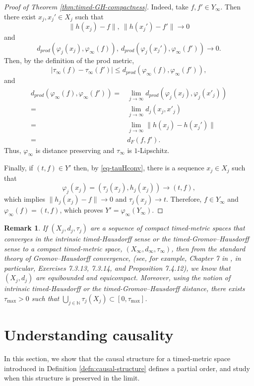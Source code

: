 \documentclass[a4paper,12pt,reqno]{amsart}
\theoremstyle{plain}
\newtheorem{rmrk}[thm]{Remark}
\newcommand{\be}{\begin{equation}}
\newcommand{\ee}{\end{equation}}
\begin{document}
\begin{proof}[Proof of Theorem \ref{thm:timed-GH-compactness}]
Indeed, take $f,f' \in Y_\infty$. 
Then there exist $x_j, x_j' \in X_j$ such that 
\be
 \| h(x_j)-f\| , \ \| h(x_j')- f'\| \to 0
\ee
and 
\be
d_{prod}(\varphi_j(x_j), \varphi_{\infty}(f)), \ 
d_{prod}(\varphi_j(x_j'), \varphi_\infty(f'))\to 0.
\ee
Then, by the definition of the prod metric,
\be
    |\tau_\infty(f)-\tau_\infty(f')|\leq d_{prod}(\varphi_\infty(f), \varphi_\infty(f')),
\ee
and
\begin{align}
d_{prod}(\varphi_\infty(f), \varphi_\infty(f'))= &
\lim_{j \to \infty}d_{prod}(\varphi_j(x_j), \varphi_j(x'_j)) \\
= & \lim_{j\to \infty} d_j(x_j, x'_j) \\
= & \lim_{j\to \infty} \| h(x_j)-h(x_j')\|  \\
= & d_F(f,f').
\end{align}
Thus, $\varphi_\infty$ is distance preserving and $\tau_\infty$ is $1$-Lipschitz. 

Finally, if $(t,f)\in Y'$ then, by \eqref{eq-tauHconv}, there is a sequence $x_j\in X_j$ such that
\[
\varphi_j(x_j) = (\tau_j(x_j),h_j(x_j))\to (t,f),
\]
which implies $\|h_j(x_j)-f\|\to 0$ and $\tau_j(x_j)\to t$. Therefore, $f\in Y_\infty$ and $\varphi_\infty(f) = (t,f)$, which proves $Y'=\varphi_\infty(Y_\infty)$.
\end{proof}



\begin{rmrk}\label{rmrk-converseEquibddEquicpct}
If $(X_j,d_j,\tau_j)$ are a sequence of compact timed-metric spaces that converges 
in the intrinsic timed-Hausdorff sense or the timed-Gromov--Hausdorff sense to a compact timed-metric space,
$(X_\infty,d_\infty,\tau_\infty)$, 
then from the standard theory of Gromov--Hausdorff convergence, 
(see, for example, Chapter 7 in \cite{BBI}, in particular, Exercises 7.3.13, 7.3.14, and Proposition 7.4.12), we know that $(X_j,d_j)$ are equibounded 
and
equicompact. Moreover, using the notion of intrinsic timed-Hausdorff or the timed-Gromov--Hausdorff distance, there exists $\tau_{\max}>0$ such that 
$\bigcup_{j\in \mathbb N}\tau_j(X_j) \subset [0, \tau_{\max}]$. 
\end{rmrk}



\section{Understanding causality}\label{s:understanding causality}

In this section, we show that the causal structure for a timed-metric space introduced in Definition \ref{defn:causal-structure} defines a partial order, and study when this structure is preserved in the limit. 
\medskip
\end{document}
